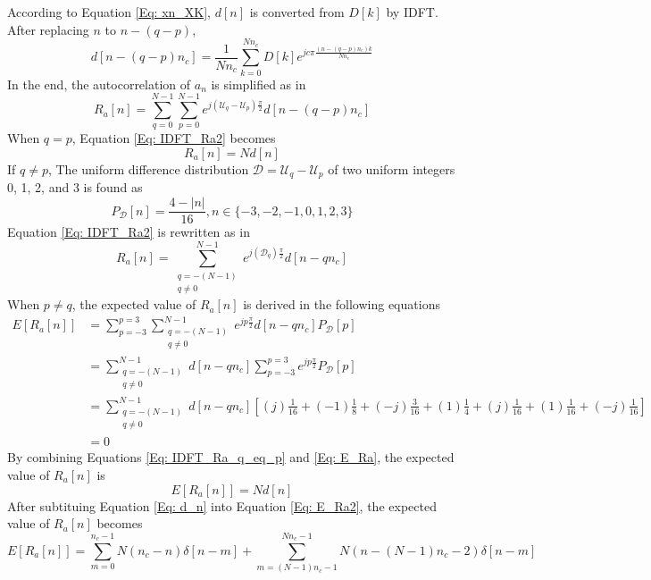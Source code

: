 \documentclass[draftcls,onecolumn]{IEEEtran}  %
\begin{document}
According to Equation \ref{Eq: xn_XK}, $d[n]$ is converted from $D[k]$ by IDFT. After replacing $n$ to $n-(q-p)$, 
\begin{equation}\label{Eq: dn_tmp}
d[n-(q-p)n_c] = \frac{1}{Nn_c} \sum\limits_{k=0}^{Nn_c} D[k] e^{jc\pi \frac{(n-(q-p)n_c) k}{Nn_c}} 
\end{equation}
In the end, the autocorrelation of $a_n$ is simplified as in
\begin{equation}\label{Eq: IDFT_Ra2}
R_a[n] = \sum\limits_{q=0}^{N-1} \sum\limits_{p=0}^{N-1} 
e^{j(\mathcal{U}_q-\mathcal{U}_p)\frac{\pi}{2}} d[n-(q-p)n_c]
\end{equation}
When $q = p$, Equation \ref{Eq: IDFT_Ra2} becomes
\begin{equation}\label{Eq: IDFT_Ra_q_eq_p}
R_a[n] = N d[n]
\end{equation}
If $q \neq p$, The uniform difference distribution $\mathcal{D} = \mathcal{U}_q-\mathcal{U}_p$ of two uniform integers 0, 1, 2, and 3 is found as 
\begin{equation}\label{Eq: diff_uni}
P_{\mathcal{D}}[n] = \frac{4-|n|}{16}, n \in \{ -3,-2,-1,0,1,2,3 \} 
\end{equation}
Equation \ref{Eq: IDFT_Ra2} is rewritten as in
\begin{equation}\label{Eq: IDFT_Ra3}
R_a[n] = \sum\limits_{\substack{q=-(N-1) \\ q\neq 0}}^{N-1} e^{j(\mathcal{D}_q)\frac{\pi}{2}} d[n-q n_c]
\end{equation}
When $p \neq q $, the expected value of $R_a[n]$ is derived in the following equations
\begin{equation}\label{Eq: E_Ra}
\begin{split}
E[R_a[n]] &= \sum\limits_{p=-3}^{p=3} \sum\limits_{\substack{q=-(N-1) \\ q\neq 0}}^{N-1}  e^{j p\frac{\pi}{2}} d[n-q n_c] P_{\mathcal{D}}[p] \\
          &= \sum\limits_{\substack{q=-(N-1) \\ q\neq 0}}^{N-1} d[n-q n_c]  \sum\limits_{p=-3}^{p=3} e^{j p\frac{\pi}{2}}  P_{\mathcal{D}}[p] \\
          &= \sum\limits_{\substack{q=-(N-1) \\ q\neq 0}}^{N-1} d[n-q n_c] [(j) \frac{1}{16} + (-1) \frac{1}{8} + (-j) \frac{3}{16} + (1) \frac{1}{4} + (j) \frac{1}{16} + (1) \frac{1}{16} + (-j) \frac{1}{16}] \\
          &= 0
\end{split}
\end{equation}
By combining Equations \ref{Eq: IDFT_Ra_q_eq_p} and \ref{Eq: E_Ra}, the expected value of $R_a[n]$ is
\begin{equation}\label{Eq: E_Ra2}
E[R_a[n]] = N d[n]
\end{equation}
After subtituing Equation \ref{Eq: d_n} into Equation \ref{Eq: E_Ra2}, the expected value of $R_a[n]$ becomes
\begin{equation}\label{Eq: E_Ra3}
E[R_a[n]] = \sum\limits_{m=0}^{n_c-1} N(n_c-n)\delta[n-m] + 
            \sum\limits_{m=(N-1)n_c-1}^{Nn_c-1} N(n-(N-1)n_c-2)\delta[n-m] 
\end{equation}
\end{document}
